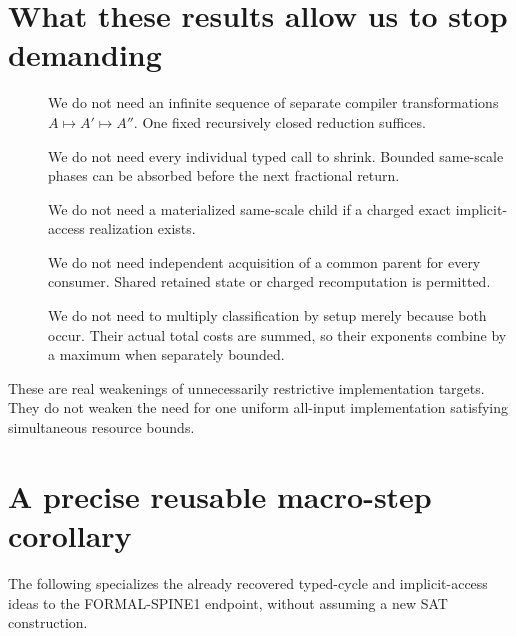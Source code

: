 \documentclass[11pt]{article}
\begin{document}
\section{What these results allow us to stop demanding}
\begin{description}
\item[] We do not need an infinite sequence of separate compiler transformations
$A\mapsto A'\mapsto A''$. One fixed recursively closed reduction suffices.
\item[] We do not need every individual typed call to shrink. Bounded same-scale
phases can be absorbed before the next fractional return.
\item[] We do not need a materialized same-scale child if a charged exact
implicit-access realization exists.
\item[] We do not need independent acquisition of a common parent for every
consumer. Shared retained state or charged recomputation is permitted.
\item[] We do not need to multiply classification by setup merely because both
occur. Their actual total costs are summed, so their exponents combine by a
maximum when separately bounded.
\end{description}
These are real weakenings of unnecessarily restrictive implementation targets.
They do not weaken the need for one uniform all-input implementation satisfying
simultaneous resource bounds.

\section{A precise reusable macro-step corollary}
The following specializes the already recovered typed-cycle and implicit-access
ideas to the FORMAL-SPINE1 endpoint, without assuming a new SAT construction.
\end{document}
